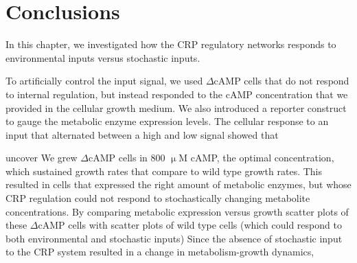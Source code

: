 \section{Conclusions}

In this chapter, 
we investigated how the CRP regulatory networks responds to environmental inputs versus stochastic inputs.
%




To artificially control the input signal, we used $\Delta$cAMP cells that do not respond to internal regulation, but instead responded to the cAMP concentration that we provided in the cellular growth medium.
We also introduced a reporter construct to gauge the metabolic enzyme expression levels.
%
The cellular response to an input that alternated between a high and low signal showed that 
%



uncover
%
We grew  $\Delta$cAMP cells in 800 $\upmu$M cAMP,
the optimal concentration, which sustained growth rates that compare to wild type growth rates. 
%
This resulted in cells that expressed the right amount of metabolic enzymes, 
but whose CRP regulation could not respond to stochastically changing metabolite concentrations.
%
By comparing metabolic expression versus growth scatter plots of these $\Delta$cAMP cells with
scatter plots of wild type cells (which could respond to both environmental and stochastic inputs)  
%
Since the absence 
of stochastic input to the CRP system resulted in a change in metabolism-growth dynamics, 

